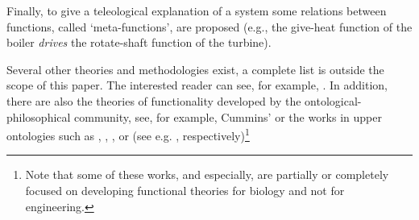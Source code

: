 \documentclass[
]{ceurart}
\begin{document}
\begin{itemize}
    Finally, to give a teleological explanation of a system some relations between functions, called `meta-functions', are proposed (e.g., the give-heat function of the boiler \textit{drives} the rotate-shaft function of the turbine). 
\end{itemize}

Several other theories and methodologies exist, a complete list is outside the scope of this paper. The interested reader can see, for example, \cite{umedaFunctionBehaviourStructure1990,qianFunctionBehaviorStructure1996, zhaoStateBehaviorFunction2019}.
In addition, there are also the theories of functionality developed by the ontological-philosophical community, see, for example, Cummins'\cite{cumminsFunctionalAnalysis1975} or the works in upper ontologies such as \BFO, \GFO, \YAMATO, or \DOLCE (see e.g. \cite{spearFunctionsBasicFormal2016, herreGeneralFormalOntology2006, sasajimaFBRLFunctionBehavior1995, borgoFormalOntologicalPerspective2009}, respectively)\footnote{Note that some of these works, \BFO and \GFO especially, are partially or completely focused on developing functional theories for biology and not for engineering.}
\end{document}
